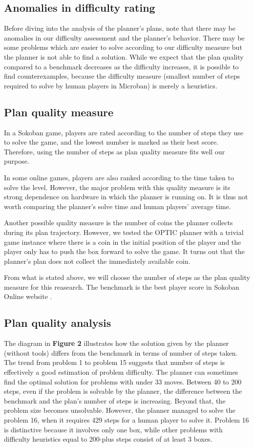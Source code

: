 \documentclass[letterpaper]{article} %
\begin{document}
\subsection{Anomalies in difficulty rating}
Before diving into the analysis of the planner's plans, note 
that there may be anomalies in our difficulty assessment 
and the planner's behavior. There may be some problems 
which are easier to solve according to our difficulty measure but 
the planner is not able to find a solution. While we expect
that the plan quality compared to a benchmark decreases as the
difficulty increases, it is possible to find counterexamples, 
because the difficulty measure (smallest
number of steps required to solve by human players in Microban) 
is merely a heuristics. 

\subsection{Plan quality measure}
In a Sokoban game, players are rated according to the number
of steps they use to solve the game, and the lowest number 
is marked as their best score. Therefore, using the number of steps 
as plan quality measure fits well our purpose. 

In some online games, players are also ranked according to 
the time taken to solve the level. However, the major problem
with this quality measure is its strong dependence 
on hardware in which the planner is running on. 
It is thus not worth comparing the planner's solve time 
and human players' average time. 

Another possible quality measure is the number of coins the 
planner collects during its plan trajectory. However, we tested 
the OPTIC planner with a trivial game instance where there is a 
coin in the initial position of the player and the player only 
has to push the box forward to solve the game. It turns out that
the planner's plan does not collect the immediately available coin. 

From what is stated above, we will choose the number of steps 
as the plan quality measure for this reasearch. 
The benchmark is the best player score in Sokoban Online website \cite{microban}.
\subsection{Plan quality analysis}
The diagram in \textbf{Figure 2} illustrates how the solution given by the 
planner (without tools) differs from the benchmark in terms of number 
of steps taken. The trend from problem 1 to problem 15 
suggests that number of steps is effectively a good estimation of 
problem difficulty. The planner can sometimes find the 
optimal solution for problems with under 33 moves. 
Between 40 to 200 steps, even if the problem is solvable 
by the planner, the difference between the benchmark and the 
plan's number of steps is increasing. 
Beyond that, the problem size becomes 
unsolvable. However, the planner managed to solve the
problem 16, when it requires 429 steps for a human player 
to solve it. 
Problem 16 is distinctive because 
it involves only one box, while other problems with difficulty 
heuristics equal to
200-plus steps consist of at least 3 boxes. 
\end{document}
